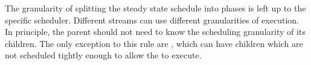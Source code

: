 \begin{comment}
The schedules created using single appearance hierarchical
scheduling tend to be quite small at the expense of larger
buffering requirements.  A quite simple situation when such
tradeoff is not desired, could be if the schedule is being stored
in a large cheap ROM device, while the RAM used for buffering data
is more expensive.  It is also quite possible that latency
constraints cannot be satisfied by a single appearance
hierarchical schedule. Clearly, a more flexible technique is
required for scheduling.

A key observation in hierarchical scheduling is that each
component only needs to worry about the data that enters or leaves
its children.  The amount of buffering done internally in a child
is not noticeable or important to the parent component. This
observation changes slightly if latency constraints are placed on
the computation. Namely, the important information to keep track
of is amount of data that leaves or enters children as well as
amount of data that crosses latency constraint boundaries.

This observation leads to a conclusion that scheduling execution
of the {\StreamIt} programs using hierarchical scheduling can be
simpler than scheduling the entire program all at once (scheduling
the program all at once requires tracking all buffers and latency
constraints at once).  Phased scheduling is a concept that expends
on hierarchical scheduling, but does not require that a stream has
a single or pseudo single appearance schedule.  Each stream is
allowed to have multiple sub-schedules, also called phases. Each
phase consists of phases of the children of the stream that will
be executed to execute the phase. The phases must be executed in
correct order. When all of the initialization phases of a stream
have been executed, the stream has executed its initialization
schedule and is ready to enter steady state execution. When all of
the steady state phases of a stream have been executed in order,
the entire steady state schedule for the stream has been executed.
\end{comment}

The granularity of splitting the steady state schedule into phases
is left up to the specific scheduler.  Different streams can use
different granularities of execution.  In principle, the parent
should not need to know the scheduling granularity of its
children. The only exception to this rule are {{\feedbackloops}},
which can have children which are not scheduled tightly enough to
allow the {{\feedbackloop}} to execute.

